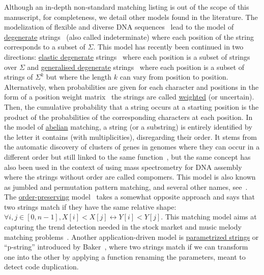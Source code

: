 Although an in-depth non-standard matching listing is out of the scope of this manuscript, for completeness, we detail other models found in the literature.
The modelization of flexible and diverse DNA sequences~\cite{comm1970iupac} lead to the model of \underline{degenerate} strings~\cite{abrahamson1987generalized} (also called indeterminate) where each position of the string corresponds to a subset of $\Sigma$.
This model has recently been continued in two directions: \underline{elastic degenerate} strings~\cite{iliopoulos2021efficient} where each position is a subset of strings over $\Sigma$ and \underline{generalised degenerate} strings~\cite{alzamel_et_al:LIPIcs:2018:9323} where each position is a subset of strings of $\Sigma^k$ but where the length $k$ can vary from position to position.
Alternatively, when probabilities are given for each character and positions in the form of a position weight matrix~\cite{thompson1994clustal} the strings are called \underline{weighted} (or uncertain). Then, the cumulative probability that a string occurs at a starting position is the product of the probabilities of the corresponding characters at each position.
In the model of \underline{abelian} matching, a string (or a substring) is entirely identified by the letter it contains (with multiplicities), disregarding their order. It stems from the automatic discovery of clusters of genes in genomes where they can occur in a different order but still linked to the same function~\cite{eres2004permutation}, but the same concept has also been used in the context  of using mass spectrometry for DNA assembly~\cite{bocker2003sequencing} where the strings without order are called compomers. This model is also known as jumbled and permutation pattern matching, and several other names, see~\cite{ejaz2010abelian}.
The \underline{order-preserving} model~\cite{kim2014order,kubica2013linear} takes a somewhat opposite approach and says that two strings match if they have the same relative shape: $\forall i,j \in [0,n-1], X[i] < X[j] \leftrightarrow Y[i] < Y[j]$. This matching model aims at capturing the trend detection needed in the stock market and music melody matching problems~\cite{kim2014order}.
%
Another application-driven model is \underline{parametrized strings} or ``p-string'' introduced by Baker~\cite{baker1993theory}, where two strings match if we can transform one into the other by applying a function renaming the parameters, meant to detect code duplication.


